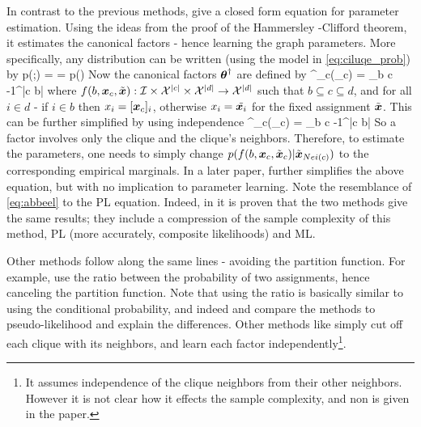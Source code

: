 In contrast to the previous methods,  \cite{abbeel2006learning} give a closed form equation for parameter estimation.
Using the ideas from the proof of the Hammersley -Clifford theorem,  it estimates the canonical factors  - hence learning the graph parameters.
More specifically, any distribution can be written (using the model in \eqref{eq:ciluqe_prob}) by 
\be
p(\xx;\exact{\thetav}) =   = p(\tilde{\xx})
\ee
Now the canonical factors $\boldsymbol{\theta}^{\dagger}$ are defined by
\be
\thetav^{\dagger}_{c}(\xx_c) = \sum_{b \subseteq c} -1^{|c \setminus b|} 
\ee
where  $f(b,\boldsymbol{x}_c,\tilde{\boldsymbol{x}}) : {\cal I} \times {\cal X}^{|c|} \times {\cal X}^{|d|}\to {\cal X}^{|d|}$ such that $b \subseteq c\subseteq d$, and for all $i \in d$ - if $i \in b$ then $x_i = [\boldsymbol{x}_c]_i$, otherwise $x_i = \tilde{\boldsymbol{x}_i}$ for the fixed assignment $\tilde{\boldsymbol{x}}$.
This can be further simplified by using independence 
\be
\label{eq:abbeel}
\thetav^{\dagger}_{c}(\xx_c) = \sum_{b \subseteq c} -1^{|c \setminus b|} 
\ee
So a factor involves only the clique and the clique's neighbors.
Therefore, to estimate the parameters, one needs to simply change $p(f(b,\boldsymbol{x}_c,\tilde{\boldsymbol{x}}_c) |\tilde{\boldsymbol{x}}_{Nei(c)})$ to the corresponding empirical marginals.
In a later paper, \cite{roy2009learning} further simplifies the above equation, but with no implication to parameter learning.
Note the resemblance of  \eqref{eq:abbeel} to the PL equation.
Indeed, in \cite{bradley2012sample} it is proven that the two methods give the same results;
they include a compression of the sample complexity of this method, PL (more accurately, composite likelihoods) and ML.

Other methods follow along the same lines - avoiding the partition function. 
For example, \cite{hyvarinen2007some} use the ratio between the probability of two assignments, hence canceling the partition function.
Note that using the ratio is basically similar to using the conditional probability, and indeed \cite{marlin2010inductive} and \cite{marlin2012asymptotic} compare the methods to pseudo-likelihood and explain the differences.
Other methods like \cite{mizrahi2014icml} simply cut off each clique with its neighbors, and learn each factor independently\footnote{It assumes independence of the clique neighbors from their other neighbors. However it is not clear how it effects the sample complexity, and non is given in the paper.}.

